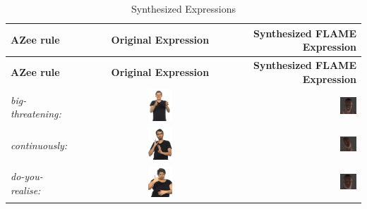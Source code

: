 \documentclass[../main.tex]{subfiles}
\begin{document}
\begin{longtable}{|l|c|r|}
    \caption{Synthesized Expressions} \label{tab:facial_expressions} \\
    \hline
    \textbf{AZee rule} & \textbf{Original Expression} & \textbf{Synthesized FLAME Expression} \\
    \hline
    \endfirsthead

    \hline
    \textbf{AZee rule} & \textbf{Original Expression} & \textbf{Synthesized FLAME Expression} \\
    \hline
    \endhead

    \hline
    \endfoot

    \hline
    \endlastfoot

    \emph{big-threatening:} & \includegraphics[width=0.15\textwidth]{chapters/facial_expressions/images/original_facial_expressions/big_threatening.png} & \includegraphics[width=0.15\textwidth]{chapters/facial_expressions/images/flame_facial_exps/big_threatening.png} \\
    \emph{continuously:} & \includegraphics[width=0.15\textwidth]{chapters/facial_expressions/images/original_facial_expressions/continuously.png} & \includegraphics[width=0.15\textwidth]{chapters/facial_expressions/images/flame_facial_exps/continuously.png} \\
    \emph{do-you-realise:} & \includegraphics[width=0.15\textwidth]{chapters/facial_expressions/images/original_facial_expressions/do_you_realise.png} & \includegraphics[width=0.15\textwidth]{chapters/facial_expressions/images/flame_facial_exps/do_you_realise.png} \\

\end{longtable}
\end{document}
